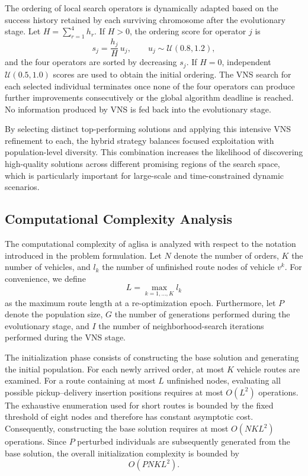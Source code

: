 \documentclass[pdflatex]{sn-jnl}
\begin{document}
The ordering of local search operators is dynamically adapted based on the success history retained by each surviving chromosome after the evolutionary stage. Let $H=\sum_{r=1}^{4}h_r$. If $H>0$, the ordering score for operator $j$ is
\begin{equation}
s_j=\frac{h_j}{H}\,u_j, \qquad u_j\sim\mathcal{U}(0.8,1.2),
\end{equation}
and the four operators are sorted by decreasing $s_j$. If $H=0$, independent $\mathcal{U}(0.5,1.0)$ scores are used to obtain the initial ordering. The VNS search for each selected individual terminates once none of the four operators can produce further improvements consecutively or the global algorithm deadline is reached. No information produced by VNS is fed back into the evolutionary stage.

By selecting distinct top-performing solutions and applying this intensive VNS refinement to each, the hybrid strategy balances focused exploitation with population-level diversity. This combination increases the likelihood of discovering high-quality solutions across different promising regions of the search space, which is particularly important for large-scale and time-constrained dynamic scenarios.
\subsection{Computational Complexity Analysis}

The computational complexity of \gls{aglisa} is analyzed with respect to the notation introduced in the problem formulation. Let $N$ denote the number of orders, $K$ the number of vehicles, and $l_k$ the number of unfinished 
route nodes of vehicle $v^k$. For convenience, we define
\[
L=\max_{k=1,\ldots,K} l_k
\]
as the maximum route length at a re-optimization epoch. Furthermore, let $P$ denote the population size, $G$ the number of generations performed during the evolutionary stage, and $I$ the number of neighborhood-search 
iterations performed during the VNS stage.

The initialization phase consists of constructing the base solution and generating the initial population. For each newly arrived order, at most $K$ vehicle routes are examined. For a route containing at most $L$ unfinished nodes, evaluating all possible pickup--delivery insertion 
positions requires at most $O(L^2)$ operations. The exhaustive enumeration used for short routes is bounded by the fixed threshold of eight nodes and therefore has constant asymptotic cost. Consequently, constructing the base solution requires at most $O(NKL^2)$ operations. Since $P$ perturbed individuals are subsequently generated from the base solution, the overall initialization complexity is bounded by
\[
O(PNKL^2).
\]
\end{document}
